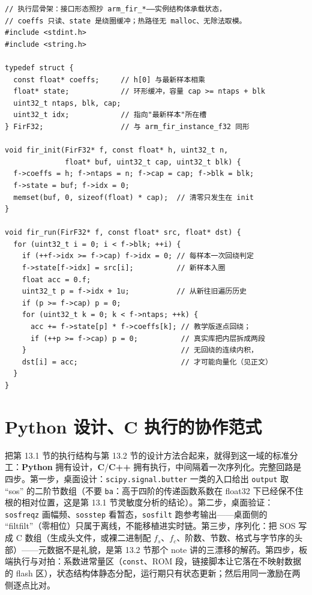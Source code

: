 \documentclass[12pt,a4paper,fontset=fandol]{ctexbook}
\newcommand{\Tp}[1]{\texttt{#1}}
\newcommand{\Bk}{\allowbreak}
\newcommand{\Lang}[1]{\textsf{\bfseries #1}}
\newcommand{\CL}{\Lang{C}}
\newcommand{\CPP}{\Lang{C++}}
\newcommand{\PY}{\Lang{Python}}
\begin{document}
\begin{lstlisting}[style=cstyle,label={lst:ch13-cmsisfir},caption={CMSIS-DSP 风格的 FIR 加绕圈缓冲：init 一次，热循环零分配}]
// 执行层骨架：接口形态照抄 arm_fir_*——实例结构体承载状态，
// coeffs 只读、state 是绕圈缓冲；热路径无 malloc、无除法取模。
#include <stdint.h>
#include <string.h>

typedef struct {
  const float* coeffs;     // h[0] 与最新样本相乘
  float* state;            // 环形缓冲，容量 cap >= ntaps + blk
  uint32_t ntaps, blk, cap;
  uint32_t idx;            // 指向"最新样本"所在槽
} FirF32;                  // 与 arm_fir_instance_f32 同形

void fir_init(FirF32* f, const float* h, uint32_t n,
              float* buf, uint32_t cap, uint32_t blk) {
  f->coeffs = h; f->ntaps = n; f->cap = cap; f->blk = blk;
  f->state = buf; f->idx = 0;
  memset(buf, 0, sizeof(float) * cap);  // 清零只发生在 init
}

void fir_run(FirF32* f, const float* src, float* dst) {
  for (uint32_t i = 0; i < f->blk; ++i) {
    if (++f->idx >= f->cap) f->idx = 0; // 每样本一次回绕判定
    f->state[f->idx] = src[i];          // 新样本入圈
    float acc = 0.f;
    uint32_t p = f->idx + 1u;           // 从新往旧遍历历史
    if (p >= f->cap) p = 0;
    for (uint32_t k = 0; k < f->ntaps; ++k) {
      acc += f->state[p] * f->coeffs[k]; // 教学版逐点回绕；
      if (++p >= f->cap) p = 0;          // 真实库把内层拆成两段
    }                                    // 无回绕的连续内积，
    dst[i] = acc;                        // 才可能向量化（见正文）
  }
}
\end{lstlisting}

\section{\PY{} 设计、\CL{} 执行的协作范式}

把第 13.1 节的执行结构与第 13.2 节的设计方法合起来，就得到这一域的标准分工：\PY{} 拥有设计，\CL{}/{\Bk}\CPP{} 拥有执行，中间隔着一次序列化。完整回路是四步。第一步，桌面设计：\Tp{scipy.signal.butter} 一类的入口给出 \Tp{output} 取 ``sos'' 的二阶节数组（不要 \Tp{ba}：高于四阶的传递函数系数在 float32 下已经保不住根的相对位置，这是第 13.1 节灵敏度分析的结论）。第二步，桌面验证：\Tp{sosfreqz} 画幅频、\Tp{sosstep} 看暂态，\Tp{sosfilt} 跑参考输出——桌面侧的 ``filtfilt''（零相位）只属于离线，不能移植进实时链。第三步，序列化：把 SOS 写成 C 数组（生成头文件，或裸二进制配 $f_s$、$f_c$、阶数、节数、格式与字节序的头部）——元数据不是礼貌，是第 13.2 节那个 note 讲的三漂移的解药。第四步，板端执行与对拍：系数进常量区（\Tp{const}、ROM 段，链接脚本让它落在不映射数据的 flash 区），状态结构体静态分配，运行期只有状态更新；然后用同一激励在两侧逐点比对。
\end{document}
